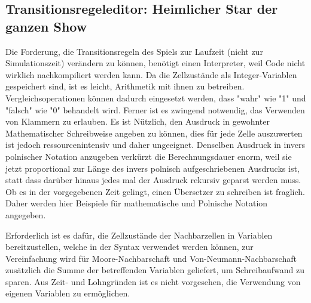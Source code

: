 \documentclass[11pt,a4paper]{article}
\begin{document}
    \pagebreak
    


\subsection{Transitionsregeleditor: Heimlicher Star der ganzen Show}
Die Forderung, die Transitionsregeln des Spiels zur Laufzeit (nicht zur Simulationszeit) verändern zu können, benötigt einen Interpreter, weil Code nicht wirklich nachkompiliert werden kann.
Da die Zellzustände als Integer-Variablen gespeichert sind, ist es leicht, Arithmetik mit ihnen zu betreiben. Vergleichsoperationen können dadurch eingesetzt werden, dass "wahr" wie "1" und "falsch" wie "0" behandelt wird. Ferner ist es zwingend notwendig, das Verwenden von Klammern zu erlauben. Es ist Nützlich, den Ausdruck in gewohnter Mathematischer Schreibweise angeben zu können, dies für jede Zelle auszuwerten ist jedoch ressourcenintensiv und daher ungeeignet. Denselben Ausdruck in invers polnischer Notation anzugeben verkürzt die Berechnungsdauer enorm, weil sie jetzt proportional zur Länge des invers polnisch aufgeschriebenen Ausdrucks ist, statt dass darüber hinaus jedes mal der Ausdruck rekursiv geparst werden muss.
Ob es in der vorgegebenen Zeit gelingt, einen Übersetzer zu schreiben ist fraglich. Daher werden hier Beispiele für mathematische und Polnische Notation angegeben.

Erforderlich ist es dafür, die Zellzustände der Nachbarzellen in Variablen bereitzustellen, welche in der Syntax verwendet werden können, zur Vereinfachung wird für Moore-Nachbarschaft und Von-Neumann-Nachbarschaft zusätzlich die Summe der betreffenden Variablen geliefert, um Schreibaufwand zu sparen. Aus Zeit- und Lohngründen ist es nicht vorgesehen, die Verwendung von eigenen Variablen zu ermöglichen. 
\end{document}
